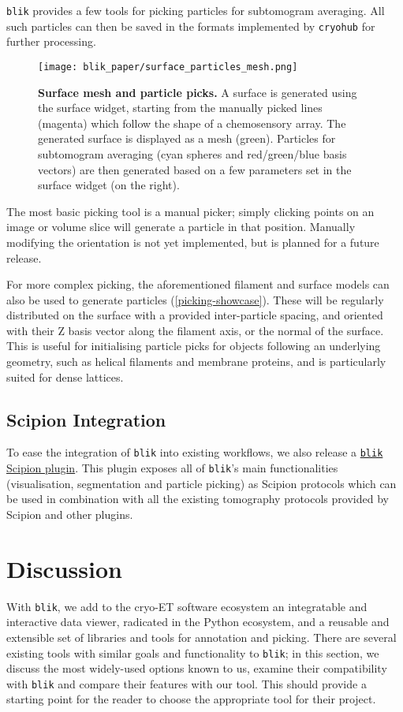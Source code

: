 \texttt{blik} provides a few tools for picking particles for subtomogram averaging. All such particles can then be saved in the formats implemented by \texttt{cryohub} for further processing.

\begin{figure}[!ht]
    \centering
    \texttt{[image: blik\_paper/surface\_particles\_mesh.png]}
    \caption[Surface mesh and particle picks]{\textbf{Surface mesh and particle picks.} A surface is generated using the surface widget, starting from the manually picked lines (magenta) which follow the shape of a chemosensory array. The generated surface is displayed as a mesh (green). Particles for subtomogram averaging (cyan spheres and red/green/blue basis vectors) are then generated based on a few parameters set in the surface widget (on the right).}
    \label{picking-showcase}
\end{figure}

The most basic picking tool is a manual picker; simply clicking points on an image or volume slice will generate a particle in that position. Manually modifying the orientation is not yet implemented, but is planned for a future release.

For more complex picking, the aforementioned filament and surface models can also be used to generate particles (\autoref{picking-showcase}). These will be regularly distributed on the surface with a provided inter-particle spacing, and oriented with their Z basis vector along the filament axis, or the normal of the surface. This is useful for initialising particle picks for objects following an underlying geometry, such as helical filaments and membrane proteins, and is particularly suited for dense lattices.

\subsection{Scipion Integration}\label{scipion-integration}

To ease the integration of \texttt{blik} into existing workflows, we also release a \href{https://github.com/scipion-em/scipion-em-blik}{\texttt{blik} Scipion plugin}. This plugin exposes all of \texttt{blik}'s main functionalities (visualisation, segmentation and particle picking) as Scipion protocols which can be used in combination with all the existing tomography protocols provided by Scipion and other plugins.

\section{Discussion}
With \texttt{blik}, we add to the cryo-ET software ecosystem an integratable and interactive data viewer, radicated in the Python ecosystem, and a reusable and extensible set of libraries and tools for annotation and picking. There are several existing tools with similar goals and functionality to \texttt{blik}; in this section, we discuss the most widely-used options known to us, examine their compatibility with \texttt{blik} and compare their features with our tool. This should provide a starting point for the reader to choose the appropriate tool for their project.

